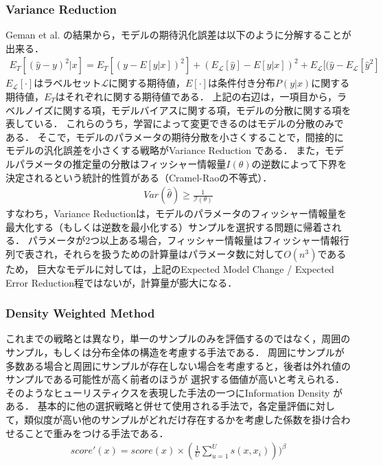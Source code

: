\subsubsection{Variance Reduction \cite{cohn1994improving}}
Geman et al. \cite{geman2008neural}の結果から，モデルの期待汎化誤差は以下のように分解することが出来る．
\begin{eqnarray}
    E_T [(\hat{y} - y)^2|x] = E_T [(y - E[y|x])^2] + (E_{\mathcal{L}}[\hat{y}] - E[y|x])^2 + E_{\mathcal{L}} [(\hat{y} - E_{\mathcal{L}}[\hat{y}^2]
\end{eqnarray}
$E_{\mathcal{L}}[\cdot]$はラベルセット$\mathcal{L}$に関する期待値，$E[\cdot]$は条件付き分布$P(y|x)$に関する期待値，$E_T$はそれぞれに関する期待値である．
上記の右辺は，一項目から，ラベルノイズに関する項，モデルバイアスに関する項，モデルの分散に関する項を表している．
これらのうち，学習によって変更できるのはモデルの分散のみである．
そこで，モデルのパラメータの期待分散を小さくすることで，間接的にモデルの汎化誤差を小さくする戦略がVariance Reduction \cite{cohn1994improving}である．
また，モデルパラメータの推定量の分散はフィッシャー情報量$I(\theta)$の逆数によって下界を決定されるという統計的性質がある（Cramel-Raoの不等式）．
\begin{eqnarray}
    Var(\hat{\theta}) \geq \frac{1}{\mathcal{I(\theta)}}
\end{eqnarray}
すなわち，Variance Reductionは，モデルのパラメータのフィッシャー情報量を最大化する（もしくは逆数を最小化する）サンプルを選択する問題に帰着される．
パラメータが2つ以上ある場合，フィッシャー情報量はフィッシャー情報行列で表され，それらを扱うための計算量はパラメータ数に対して$O(n^3)$であるため，
巨大なモデルに対しては，上記のExpected Model Change / Expected Error Reduction程ではないが，計算量が膨大になる．

\subsubsection{Density Weighted Method}
これまでの戦略とは異なり，単一のサンプルのみを評価するのではなく，周囲のサンプル，もしくは分布全体の構造を考慮する手法である．
周囲にサンプルが多数ある場合と周囲にサンプルが存在しない場合を考慮すると，後者は外れ値のサンプルである可能性が高く前者のほうが
選択する価値が高いと考えられる．
そのようなヒューリスティクスを表現した手法の一つにInformation Density \cite{settles2008analysis}がある．
基本的に他の選択戦略と併せて使用される手法で，各定量評価に対して，類似度が高い他のサンプルがどれだけ存在するかを考慮した係数を掛け合わせることで重みをつける手法である．
\begin{eqnarray}
    score'(x) = score(x) \times (\frac{1}{U} \sum_{u=1}^{U} s(x, x_i)))^{\beta}
\end{eqnarray}

